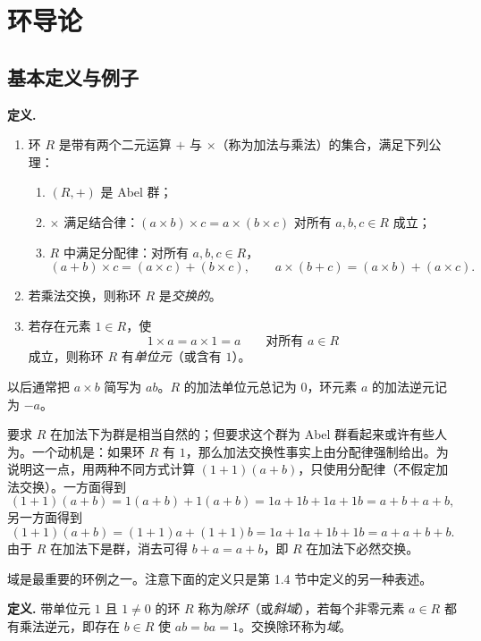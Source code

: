


\chapter{环导论}

\section{基本定义与例子}

\noindent\textbf{定义.}
\begin{enumerate}[label=(\arabic*)]
  \item 环 $R$ 是带有两个二元运算 $+$ 与 $\times$（称为加法与乘法）的集合，满足下列公理：
  \begin{enumerate}[label=(\roman*)]
    \item $(R,+)$ 是 Abel 群；
    \item $\times$ 满足结合律：$(a\times b)\times c=a\times(b\times c)$ 对所有 $a,b,c\in R$ 成立；
    \item $R$ 中满足分配律：对所有 $a,b,c\in R$，
    \[
      (a+b)\times c=(a\times c)+(b\times c),
      \qquad
      a\times(b+c)=(a\times b)+(a\times c).
    \]
  \end{enumerate}
  \item 若乘法交换，则称环 $R$ 是\emph{交换的}。
  \item 若存在元素 $1\in R$，使
  \[
    1\times a=a\times1=a\qquad\text{对所有 }a\in R
  \]
  成立，则称环 $R$ 有\emph{单位元}（或含有 $1$）。
\end{enumerate}

以后通常把 $a\times b$ 简写为 $ab$。$R$ 的加法单位元总记为 $0$，环元素 $a$ 的加法逆元记为 $-a$。

要求 $R$ 在加法下为群是相当自然的；但要求这个群为 Abel 群看起来或许有些人为。一个动机是：如果环 $R$ 有 $1$，那么加法交换性事实上由分配律强制给出。为说明这一点，用两种不同方式计算 $(1+1)(a+b)$，只使用分配律（不假定加法交换）。一方面得到
\[
  (1+1)(a+b)=1(a+b)+1(a+b)=1a+1b+1a+1b=a+b+a+b,
\]
另一方面得到
\[
  (1+1)(a+b)=(1+1)a+(1+1)b=1a+1a+1b+1b=a+a+b+b.
\]
由于 $R$ 在加法下是群，消去可得 $b+a=a+b$，即 $R$ 在加法下必然交换。

域是最重要的环例之一。注意下面的定义只是第 1.4 节中定义的另一种表述。

\medskip
\noindent\textbf{定义.} 带单位元 $1$ 且 $1\neq0$ 的环 $R$ 称为\emph{除环}（或\emph{斜域}），若每个非零元素 $a\in R$ 都有乘法逆元，即存在 $b\in R$ 使 $ab=ba=1$。交换除环称为\emph{域}。

